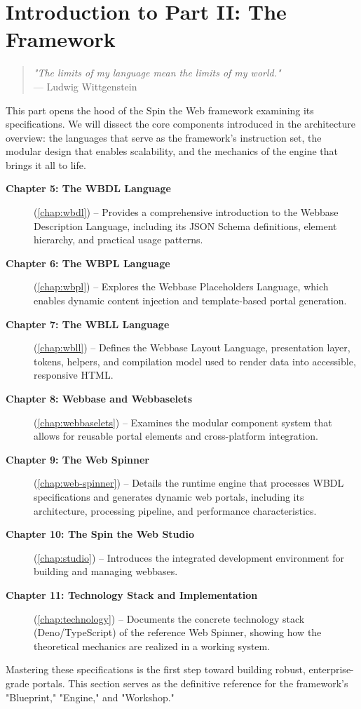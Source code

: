 
\chapter*{Introduction to Part II: The Framework}
\label{part:framework}

\begin{quote}
\textit{"The limits of my language mean the limits of my world."} \\
— Ludwig Wittgenstein
\end{quote}

This part opens the hood of the Spin the Web framework examining its specifications. We will dissect the core components introduced in the architecture overview: the languages that serve as the framework's instruction set, the modular design that enables scalability, and the mechanics of the engine that brings it all to life.

\begin{description}
\item[\textbf{Chapter 5: The WBDL Language}] (\cref{chap:wbdl}) -- Provides a comprehensive introduction to the Webbase Description Language, including its JSON Schema definitions, element hierarchy, and practical usage patterns.

\item[\textbf{Chapter 6: The WBPL Language}] (\cref{chap:wbpl}) -- Explores the Webbase Placeholders Language, which enables dynamic content injection and template-based portal generation.

\item[\textbf{Chapter 7: The WBLL Language}] (\cref{chap:wbll}) -- Defines the Webbase Layout Language, presentation layer, tokens, helpers, and compilation model used to render data into accessible, responsive HTML.

\item[\textbf{Chapter 8: Webbase and Webbaselets}] (\cref{chap:webbaselets}) -- Examines the modular component system that allows for reusable portal elements and cross-platform integration.

\item[\textbf{Chapter 9: The Web Spinner}] (\cref{chap:web-spinner}) -- Details the runtime engine that processes WBDL specifications and generates dynamic web portals, including its architecture, processing pipeline, and performance characteristics.

\item[\textbf{Chapter 10: The Spin the Web Studio}] (\cref{chap:studio}) -- Introduces the integrated development environment for building and managing webbases.

\item[\textbf{Chapter 11: Technology Stack and Implementation}] (\cref{chap:technology}) -- Documents the concrete technology stack (Deno/TypeScript) of the reference Web Spinner, showing how the theoretical mechanics are realized in a working system.
\end{description}

Mastering these specifications is the first step toward building robust, enterprise-grade portals. This section serves as the definitive reference for the framework's "Blueprint," "Engine," and "Workshop."
